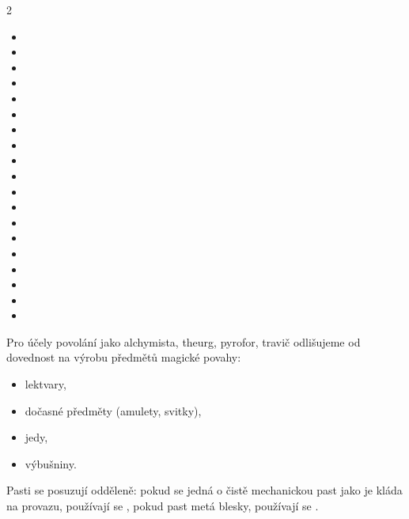 \documentclass[../main.tex]{subfiles}
\begin{document}
\begin{multicols}{2}
  \begin{itemize}
    \item {}
    \item {}
    \item {}
    \item {}
    \item {}
    \item {}
    \item {}
    \item {}
    \item {}
    \item {}
    \item {}
    \item {}
    \item {}
    \item {}
    \item {}
    \item {}
    \item {}
    \item {}
    \item {}
  \end{itemize}
\end{multicols}

\begin{prozatimni}
  Pro účely povolání jako alchymista, theurg, pyrofor, travič odlišujeme od 
  dovednost na výrobu předmětů magické povahy:
  \begin{itemize}
    \item lektvary,
    \item dočasné předměty (amulety, svitky),
    \item jedy,
    \item výbušniny.
  \end{itemize}
  Pasti se posuzují odděleně: pokud se jedná o čistě mechanickou past jako je kláda na
  provazu, používají se , pokud past metá blesky, používají se .
\end{prozatimni}
\end{document}
